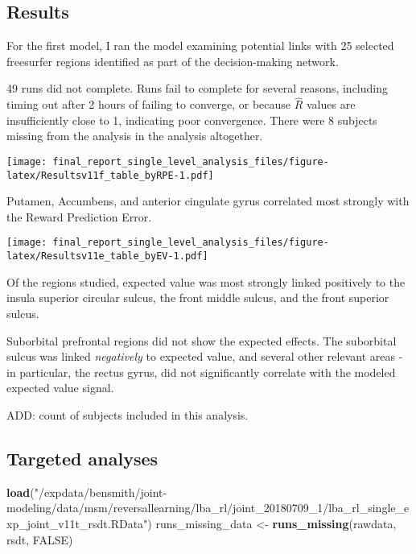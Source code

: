 \documentclass[]{article}
\newenvironment{Shaded}{\begin{snugshade}}{\end{snugshade}}
\newcommand{\KeywordTok}[1]{\textcolor[rgb]{0.13,0.29,0.53}{\textbf{{#1}}}}
\newcommand{\StringTok}[1]{\textcolor[rgb]{0.31,0.60,0.02}{{#1}}}
\newcommand{\OtherTok}[1]{\textcolor[rgb]{0.56,0.35,0.01}{{#1}}}
\newcommand{\NormalTok}[1]{{#1}}
\begin{document}
\subsection{Results}\label{results}

For the first model, I ran the model examining potential links with 25
selected freesurfer regions identified as part of the decision-making
network.

49 runs did not complete. Runs fail to complete for several reasons,
including timing out after 2 hours of failing to converge, or because
\(\hat{R}\) values are insufficiently close to 1, indicating poor
convergence. There were 8 subjects missing from the analysis in the
analysis altogether.

\texttt{[image: final\_report\_single\_level\_analysis\_files/figure-latex/Resultsv11f\_table\_byRPE-1.pdf]}

Putamen, Accumbens, and anterior cingulate gyrus correlated most
strongly with the Reward Prediction Error.

\texttt{[image: final\_report\_single\_level\_analysis\_files/figure-latex/Resultsv11e\_table\_byEV-1.pdf]}

Of the regions studied, expected value was most strongly linked
positively to the insula superior circular sulcus, the front middle
sulcus, and the front superior sulcus.

Suborbital prefrontal regions did not show the expected effects. The
suborbital sulcus was linked \emph{negatively} to expected value, and
several other relevant areas - in particular, the rectus gyrus, did not
significantly correlate with the modeled expected value signal.

ADD: count of subjects included in this analysis.

\subsection{Targeted analyses}\label{targeted-analyses}

\begin{Shaded}
\begin{Highlighting}[]
\KeywordTok{load}\NormalTok{(}\StringTok{"/expdata/bensmith/joint-modeling/data/msm/reversallearning/lba_rl/joint_20180709_1/lba_rl_single_exp_joint_v11t_rsdt.RData"}\NormalTok{)}
\NormalTok{runs_missing_data <-}\StringTok{ }\KeywordTok{runs_missing}\NormalTok{(rawdata, rsdt, }\OtherTok{FALSE}\NormalTok{)}
\end{Highlighting}
\end{Shaded}
\end{document}
